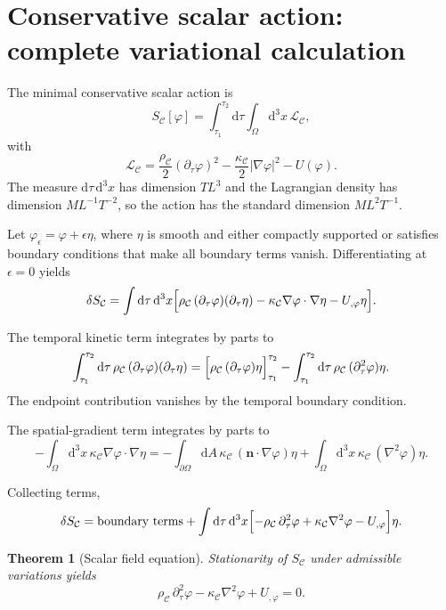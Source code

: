 \documentclass[11pt,a4paper]{article}
\newtheorem{theorem}[axiom]{Theorem}
\newcommand{\C}{\mathcal{C}}
\renewcommand{\dd}{\mathrm{d}}
\newcommand{\Lag}{\mathcal{L}}
\newcommand{\rhoC}{\rho_{\mathcal{C}}}
\newcommand{\kC}{\kappa_{\mathcal{C}}}
\newcommand{\Boxed}[1]{\boxed{\displaystyle #1}}
\begin{document}
\section{Conservative scalar action: complete variational calculation}

The minimal conservative scalar action is
\begin{equation}
S_{\C}[\varphi]=\int_{\tau_1}^{\tau_2}\dd\tau\int_\Omega\dd^3x\,\Lag_{\C},
\label{eq:scalar-action}
\end{equation}
with
\[
\Lag_{\C}=\frac{\rhoC}{2}(\partial_\tau\varphi)^2-\frac{\kC}{2}|\nabla\varphi|^2-U(\varphi).
\]
The measure \(\dd\tau\,\dd^3x\) has dimension \(TL^3\) and the Lagrangian density has dimension \(ML^{-1}T^{-2}\), so the action has the standard dimension \(ML^2T^{-1}\).

Let \(\varphi_\epsilon=\varphi+\epsilon\eta\), where \(\eta\) is smooth and either compactly supported or satisfies boundary conditions that make all boundary terms vanish. Differentiating at \(\epsilon=0\) yields
\begin{equation}
\delta S_{\C}=\int\dd\tau\,\dd^3x\Bigl[\rhoC\,(\partial_\tau\varphi)(\partial_\tau\eta)-\kC\nabla\varphi\cdot\nabla\eta-U_{,\varphi}\eta\Bigr].
\end{equation}

The temporal kinetic term integrates by parts to
\begin{equation}
\int_{\tau_1}^{\tau_2}\dd\tau\,\rhoC\,(\partial_\tau\varphi)(\partial_\tau\eta)=\Bigl[\rhoC\,(\partial_\tau\varphi)\eta\Bigr]_{\tau_1}^{\tau_2}-\int_{\tau_1}^{\tau_2}\dd\tau\,\rhoC\,(\partial_\tau^2\varphi)\eta.
\end{equation}
The endpoint contribution vanishes by the temporal boundary condition.

The spatial-gradient term integrates by parts to
\begin{equation}
-\int_\Omega\dd^3x\,\kC\nabla\varphi\cdot\nabla\eta=-\int_{\partial\Omega}\dd A\,\kC\,(\mathbf{n}\cdot\nabla\varphi)\eta+\int_\Omega\dd^3x\,\kC\,(\nabla^2\varphi)\eta.
\end{equation}

Collecting terms,
\begin{equation}
\delta S_{\C}=\text{boundary terms}+\int\dd\tau\,\dd^3x\Bigl[-\rhoC\,\partial_\tau^2\varphi+\kC\nabla^2\varphi-U_{,\varphi}\Bigr]\eta.
\end{equation}

\begin{theorem}[Scalar field equation]
Stationarity of \(S_{\C}\) under admissible variations yields
\[
\Boxed{\rhoC\,\partial_\tau^2\varphi-\kC\nabla^2\varphi+U_{,\varphi}=0.}
\]
\end{theorem}
\end{document}
